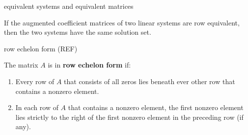 \documentclass[avery5371,grid]{flashcards}
\newcommand{\defn}[1]{\textbf{#1}}
\begin{document}
\begin{flashcard}[\S 3.2 Theorem 1]{equivalent systems and equivalent
    matrices}

  If the augmented coefficient matrices of two linear systems are row
  equivalent, then the two systems have the same solution set.

\end{flashcard}

\begin{flashcard}[Definition]{row echelon form (REF)}

  The matrix $A$ is in \defn{row echelon form} if:
  \begin{enumerate}
  \item Every row of $A$ that consists of all zeros lies beneath ever
    other row that contains a nonzero element.
  \item In each row of $A$ that contains a nonzero element, the first
    nonzero element lies strictly to the right of the first nonzero
    element in the preceding row (if any).
  \end{enumerate}

\end{flashcard}



\end{document}
